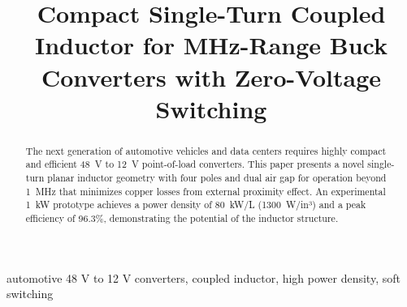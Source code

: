 \documentclass{IPEC2026TEC}
\begin{document}
\title{Compact Single-Turn Coupled Inductor for MHz-Range Buck Converters with Zero-Voltage Switching}

\author{
}

\maketitle

\begin{abstract}
The next generation of automotive vehicles and data centers requires highly compact and efficient 48~V to 12~V point-of-load converters. This paper presents a novel single-turn planar inductor geometry with four poles and dual air gap for operation beyond 1~MHz that minimizes copper losses from external proximity effect. An experimental 1~kW prototype achieves a power density of 80~kW/L (1300~W/in³) and a peak efficiency of 96.3\%, demonstrating the potential of the inductor structure.
\end{abstract}

\begin{IEEEkeywords}
automotive 48 V to 12 V converters, coupled inductor, high power density, soft switching
\end{IEEEkeywords}
\end{document}
